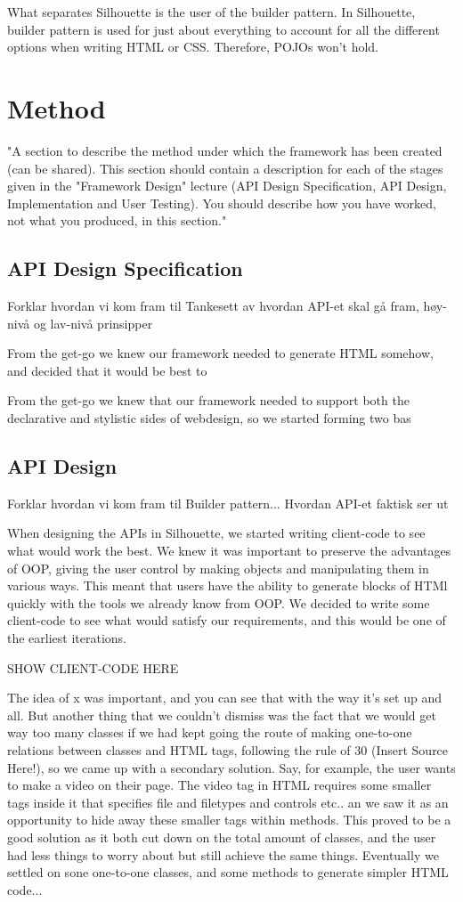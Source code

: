 \documentclass[12pt]{article}
\begin{document}
What separates Silhouette is the user of the builder pattern. In Silhouette, builder pattern is used for just about everything to account for all the different options when writing HTML or CSS. Therefore, POJOs won't hold. 

\section{Method}
"A section to describe the method under which the framework has been created (can be shared). This section should contain a description for each of the stages given in the "Framework Design" lecture (API Design Specification, API Design, Implementation and User Testing). 
You should describe how you have worked, not what you produced, in this section."

    \subsection{API Design Specification}
    Forklar hvordan vi kom fram til Tankesett av hvordan API-et skal gå fram, høy-nivå og lav-nivå prinsipper

    From the get-go we knew our framework needed to generate HTML somehow, and decided that it would be best to 

    From the get-go we knew that our framework needed to support both the declarative and stylistic sides of webdesign, so we started forming two bas
    

    \subsection{API Design}
    Forklar hvordan vi kom fram til Builder pattern... Hvordan API-et faktisk ser ut

    When designing the APIs in Silhouette, we started writing client-code to see what would work the best. We knew it was important to preserve the advantages of OOP, giving the user control by making objects and manipulating them in various ways. This meant that users have the ability to generate blocks of HTMl quickly with the tools we already know from OOP. We decided to write some client-code to see what would satisfy our requirements, and this would be one of the earliest iterations.

    SHOW CLIENT-CODE HERE
    
    The idea of x was important, and you can see that with the way it's set up and all. But another thing that we couldn't dismiss was the fact that we would get way too many classes if we had kept going the route of making one-to-one relations between classes and HTML tags, following the rule of 30 (Insert Source Here!), so we came up with a secondary solution. Say, for example, the user wants to make a video on their page. The video tag in HTML requires some smaller tags inside it that specifies file and filetypes and controls etc.. an we saw it as an opportunity to hide away these smaller tags within methods. This proved to be a good solution as it both cut down on the total amount of classes, and the user had less things to worry about but still achieve the same things. Eventually we settled on sone one-to-one classes, and some methods to generate simpler HTML code...
    
\end{document}
